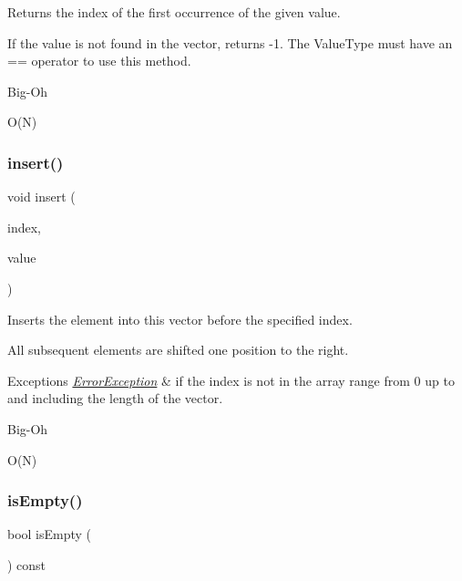 Returns the index of the first occurrence of the given value. 

If the value is not found in the vector, returns -\/1. The Value\+Type must have an == operator to use this method. \begin{DoxyRefDesc}{Big-\/\+Oh}
\item[\mbox{\hyperlink{BigOh__BigOh000114}{Big-\/\+Oh}}]O(\+N) \end{DoxyRefDesc}
\mbox{\label{classVector_a0b5f5f8e87079d043caa9e5ed00d2941}} 
\subsubsection{\texorpdfstring{insert()}{insert()}}
{\footnotesize\ttfamily void insert (\begin{DoxyParamCaption}\item[{int}]{index,  }\item[{const Value\+Type \&}]{value }\end{DoxyParamCaption})}



Inserts the element into this vector before the specified index. 

All subsequent elements are shifted one position to the right. 
\begin{DoxyExceptions}{Exceptions}
{\em \mbox{\hyperlink{classErrorException}{Error\+Exception}}} & if the index is not in the array range from 0 up to and including the length of the vector. \\
\hline
\end{DoxyExceptions}
\begin{DoxyRefDesc}{Big-\/\+Oh}
\item[\mbox{\hyperlink{BigOh__BigOh000115}{Big-\/\+Oh}}]O(\+N) \end{DoxyRefDesc}
\mbox{\label{classVector_acf82f9b2937375c7b1cf3dccb3df3312}} 
\subsubsection{\texorpdfstring{is\+Empty()}{isEmpty()}}
{\footnotesize\ttfamily bool is\+Empty (\begin{DoxyParamCaption}{ }\end{DoxyParamCaption}) const}



